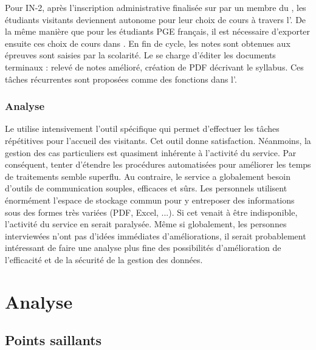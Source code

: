 \documentclass{book}
\begin{document}
Pour IN-2, après l'inscription administrative finalisée sur 
par un membre du \sintl, les étudiants visitants deviennent autonome pour 
leur choix de cours à travers l'. De la même manière
que pour les étudiants PGE français, il est nécessaire d'exporter ensuite
ces choix de cours dans . En fin de cycle, les notes sont
obtenues aux épreuves sont saisies par la scolarité. Le \sintl se charge
d'éditer les documents terminaux : relevé de notes amélioré, création
de PDF décrivant le syllabus. Ces tâches récurrentes sont proposées
comme des fonctions dans l'.
 

\subsection{Analyse}

Le \sintl utilise intensivement l'outil spécifique \textit{}
qui permet d'effectuer les tâches répétitives pour l'accueil des visitants.
Cet outil donne satisfaction. 
Néanmoins, la gestion des cas particuliers est quasiment inhérente à 
l'activité du service. Par conséquent, tenter d'étendre les procédures 
automatisées pour améliorer les temps de traitements semble superflu.
Au contraire, le service a globalement besoin d'outils de communication
souples, efficaces et sûrs. Les personnels utilisent énormément l'espace
de stockage commun\index{\clecommun} pour y entreposer des informations
sous des formes très variées (PDF, Excel, ...). Si cet \motcle{\clecommun}
venait à être indisponible, l'activité du service en serait paralysée.
Même si globalement, les personnes interviewées n'ont pas d'idées immédiates
d'améliorations, il serait probablement intéressant de faire une analyse
plus fine des possibilités d'amélioration de  l'efficacité et de la sécurité 
de la gestion des données.  
 







\chapter{Analyse}

\section{Points saillants}
\end{document}
